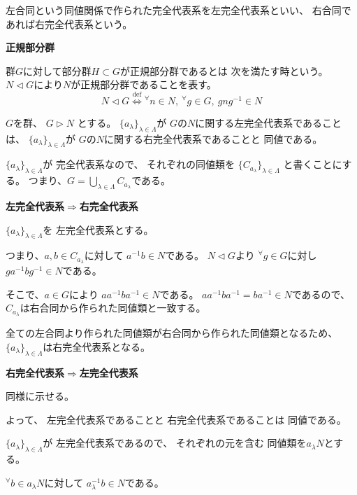 \documentclass[12pt,b5paper]{ltjsarticle}
\begin{document}
左合同という同値関係で作られた完全代表系を左完全代表系といい、
右合同であれば右完全代表系という。

\hrulefill

\textbf{正規部分群}

群$G$に対して部分群$H\subset G$が正規部分群であるとは
次を満たす時という。
$N \triangleleft G$により$N$が正規部分群であることを表す。
\begin{equation}
 N \triangleleft G
  \overset{\mathrm{def}}{\iff}
  {}^{\forall}n\in N,\: {}^{\forall}g\in G, \: gng^{-1}\in N
\end{equation}


\hrulefill

$G$を群、
$G \triangleright N$
とする。
$\{ a_{\lambda}\}_{\lambda \in \Lambda}$が
$G$の$N$に関する左完全代表系であることは、
$\{ a_{\lambda}\}_{\lambda \in \Lambda}$が
$G$の$N$に関する右完全代表系であることと
同値である。


\dotfill

$\{ a_{\lambda}\}_{\lambda \in \Lambda}$が
完全代表系なので、
それぞれの同値類を
$\{ C_{a_{\lambda}} \}_{\lambda \in \Lambda}$
と書くことにする。
つまり、$G=\bigcup_{\lambda \in \Lambda} C_{a_{\lambda}}$である。

\textbf{左完全代表系$\Rightarrow$右完全代表系}

$\{ a_{\lambda}\}_{\lambda \in \Lambda}$を
左完全代表系とする。

つまり、$a,b \in C_{a_{\lambda}}$に対して
$a^{-1}b \in N$である。
$N\triangleleft G$より
${}^{\forall}g\in G$に対し
$ga^{-1}bg^{-1} \in N$である。

そこで、$a\in G$により
$aa^{-1}ba^{-1} \in N$である。
$aa^{-1}ba^{-1} =ba^{-1} \in N$であるので、
$C_{a_{\lambda}}$は右合同から作られた同値類と一致する。

全ての左合同より作られた同値類が右合同から作られた同値類となるため、
$\{ a_{\lambda}\}_{\lambda \in \Lambda}$は右完全代表系となる。

\textbf{右完全代表系$\Rightarrow$左完全代表系}

同様に示せる。


よって、
左完全代表系であることと
右完全代表系であることは
同値である。


\dotfill
[修正]
\dotfill


$\{ a_{\lambda}\}_{\lambda \in \Lambda}$が
左完全代表系であるので、
それぞれの元を含む
同値類を$a_{\lambda}N$とする。

${}^{\forall}b \in a_{\lambda}N$に対して
$a_{\lambda}^{-1}b \in N$である。
\end{document}
